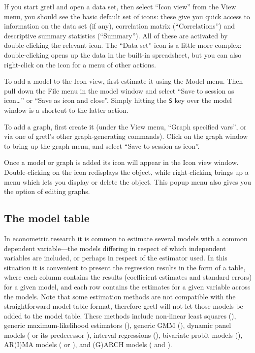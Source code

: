 If you start gretl and open a data set, then select ``Icon
view'' from the View menu, you should see the basic default set of
icons: these give you quick access to information on the data set (if
any), correlation matrix (``Correlations'') and descriptive summary
statistics (``Summary''). All of these are activated by
double-clicking the relevant icon.  The ``Data set'' icon is a little
more complex: double-clicking opens up the data in the built-in
spreadsheet, but you can also right-click on the icon for a menu of
other actions.

To add a model to the Icon view, first estimate it using the Model
menu.  Then pull down the File menu in the model window and select
``Save to session as icon\dots{}'' or ``Save as icon and close''.
Simply hitting the \verb+S+ key over the model window is a shortcut to
the latter action.

To add a graph, first create it (under the View menu, ``Graph
specified vars'', or via one of gretl's other graph-generating
commands).  Click on the graph window to bring up the graph menu, and
select ``Save to session as icon''.

Once a model or graph is added its icon will appear in the Icon view
window.  Double-clicking on the icon redisplays the object, while
right-clicking brings up a menu which lets you display or delete the
object.  This popup menu also gives you the option of editing graphs.

\subsection{The model table}
\label{model-table}

In econometric research it is common to estimate several models with a
common dependent variable---the models differing in respect of which
independent variables are included, or perhaps in respect of the
estimator used.  In this situation it is convenient to present the
regression results in the form of a table, where each column contains
the results (coefficient estimates and standard errors) for a given
model, and each row contains the estimates for a given variable across
the models.
Note that some estimation methods are not compatible with the 
straightforward model table format, therefore
gretl will not let those models be added to the model table. These 
methods include non-linear least squares (), generic 
maximum-likelihood estimators (), generic GMM (),
dynamic panel models ( or its predecessor ),
interval regressions (), bivariate probit models 
(), AR(I)MA models ( or ), and
(G)ARCH models ( and ).

